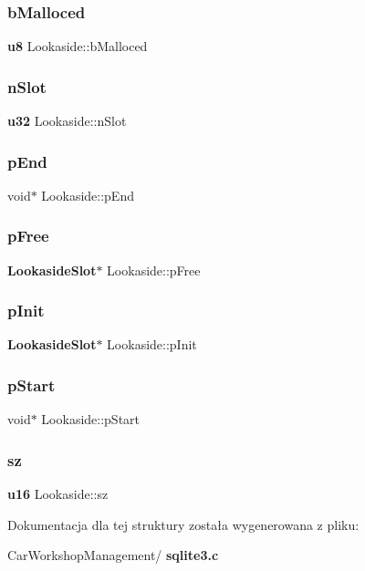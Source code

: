 \subsubsection{bMalloced}
{\footnotesize\ttfamily \textbf{ u8} Lookaside\+::b\+Malloced}

\mbox{\label{struct_lookaside_a3cd23eb12e1111b2b46f7baa4bdf2204}} 
\subsubsection{nSlot}
{\footnotesize\ttfamily \textbf{ u32} Lookaside\+::n\+Slot}

\mbox{\label{struct_lookaside_ad3555c5558e104f2b82f62bf642cf831}} 
\subsubsection{pEnd}
{\footnotesize\ttfamily void$\ast$ Lookaside\+::p\+End}

\mbox{\label{struct_lookaside_a318d2faa7f976f9d1b3c6e08bdc1d992}} 
\subsubsection{pFree}
{\footnotesize\ttfamily \textbf{ Lookaside\+Slot}$\ast$ Lookaside\+::p\+Free}

\mbox{\label{struct_lookaside_a237e0753acfe8506a3978178ada51a0d}} 
\subsubsection{pInit}
{\footnotesize\ttfamily \textbf{ Lookaside\+Slot}$\ast$ Lookaside\+::p\+Init}

\mbox{\label{struct_lookaside_a47073fcdffdc5a7a1464f0d09bfc17f9}} 
\subsubsection{pStart}
{\footnotesize\ttfamily void$\ast$ Lookaside\+::p\+Start}

\mbox{\label{struct_lookaside_a2e8346b6cebbb64d9a6886a19ef843a1}} 
\subsubsection{sz}
{\footnotesize\ttfamily \textbf{ u16} Lookaside\+::sz}



Dokumentacja dla tej struktury została wygenerowana z pliku\+:\begin{DoxyCompactItemize}
\item 
Car\+Workshop\+Management/\textbf{ sqlite3.\+c}\end{DoxyCompactItemize}
